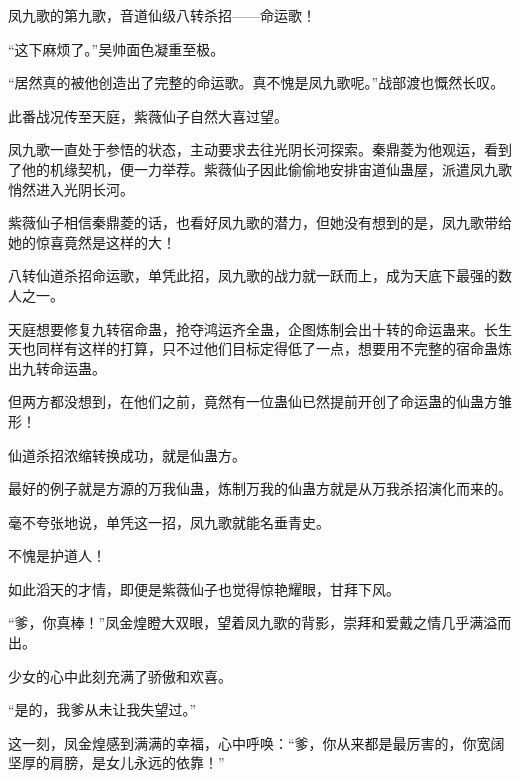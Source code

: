 \begin{this_body}
凤九歌的第九歌，音道仙级八转杀招——命运歌！

“这下麻烦了。”吴帅面色凝重至极。

“居然真的被他创造出了完整的命运歌。真不愧是凤九歌呢。”战部渡也慨然长叹。

此番战况传至天庭，紫薇仙子自然大喜过望。

凤九歌一直处于参悟的状态，主动要求去往光阴长河探索。秦鼎菱为他观运，看到了他的机缘契机，便一力举荐。紫薇仙子因此偷偷地安排宙道仙蛊屋，派遣凤九歌悄然进入光阴长河。

紫薇仙子相信秦鼎菱的话，也看好凤九歌的潜力，但她没有想到的是，凤九歌带给她的惊喜竟然是这样的大！

八转仙道杀招命运歌，单凭此招，凤九歌的战力就一跃而上，成为天底下最强的数人之一。

天庭想要修复九转宿命蛊，抢夺鸿运齐全蛊，企图炼制会出十转的命运蛊来。长生天也同样有这样的打算，只不过他们目标定得低了一点，想要用不完整的宿命蛊炼出九转命运蛊。

但两方都没想到，在他们之前，竟然有一位蛊仙已然提前开创了命运蛊的仙蛊方雏形！

仙道杀招浓缩转换成功，就是仙蛊方。

最好的例子就是方源的万我仙蛊，炼制万我的仙蛊方就是从万我杀招演化而来的。

毫不夸张地说，单凭这一招，凤九歌就能名垂青史。

不愧是护道人！

如此滔天的才情，即便是紫薇仙子也觉得惊艳耀眼，甘拜下风。

“爹，你真棒！”凤金煌瞪大双眼，望着凤九歌的背影，崇拜和爱戴之情几乎满溢而出。

少女的心中此刻充满了骄傲和欢喜。

“是的，我爹从未让我失望过。”

这一刻，凤金煌感到满满的幸福，心中呼唤：“爹，你从来都是最厉害的，你宽阔坚厚的肩膀，是女儿永远的依靠！”

\end{this_body}

